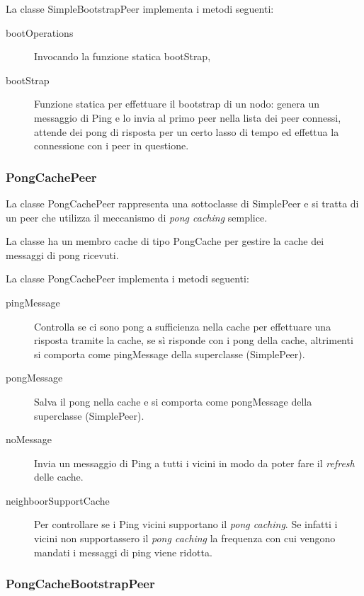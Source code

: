 \documentclass[a4paper,11pt]{article}
\begin{document}
La classe \textsf{SimpleBootstrapPeer} implementa i metodi seguenti:
\begin{description}
\item[\textsf{bootOperations}] Invocando la funzione statica \textsf{bootStrap},
\item[\textsf{bootStrap}] Funzione statica per effettuare  il bootstrap di un nodo: genera un messaggio di Ping e lo invia al primo peer nella lista dei peer connessi, attende dei pong di risposta per un certo lasso di tempo ed effettua la connessione con i peer in questione.
\end{description}

\subsubsection{\textsf{PongCachePeer}}

La classe \textsf{PongCachePeer} rappresenta una sottoclasse di \textsf{SimplePeer} e si tratta di un peer che utilizza il meccanismo di \emph{pong caching} semplice.

La classe ha un membro \textsf{cache} di tipo \textsf{PongCache} per gestire la cache dei messaggi di pong ricevuti.

La classe \textsf{PongCachePeer} implementa i metodi seguenti:
\begin{description}
\item[\textsf{pingMessage}] Controlla se ci sono pong a sufficienza nella cache per effettuare una risposta tramite la cache, se s\`i risponde con i pong della cache, altrimenti si comporta come \textsf{pingMessage} della superclasse (\textsf{SimplePeer}).
\item[\textsf{pongMessage}] Salva il pong nella cache e si comporta come \textsf{pongMessage} della superclasse (\textsf{SimplePeer}).
\item[\textsf{noMessage}] Invia un messaggio di Ping a tutti i vicini in modo da poter fare il \emph{refresh} delle cache.
\item[\textsf{neighboorSupportCache}] Per controllare se i Ping vicini supportano il \emph{pong caching}. Se infatti i vicini non supportassero il \emph{pong caching} la frequenza con cui vengono mandati i messaggi di ping viene ridotta. 
\end{description}

\subsubsection{\textsf{PongCacheBootstrapPeer}}
\end{document}
